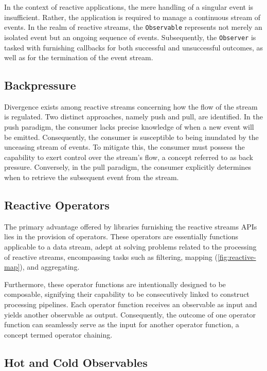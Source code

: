 \documentclass[12pt,a4paper,openright,twoside]{book}
\begin{document}
In the context of reactive applications, the mere handling of a singular event is insufficient. Rather, the application is required to manage a continuous stream of events. In the realm of reactive streams, the \texttt{Observable} represents not merely an isolated event but an ongoing sequence of events. Subsequently, the \texttt{Observer} is tasked with furnishing callbacks for both successful and unsuccessful outcomes, as well as for the termination of the event stream.

\subsection{Backpressure}

Divergence exists among reactive streams concerning how the flow of the stream is regulated. Two distinct approaches, namely push and pull, are identified. In the push paradigm, the consumer lacks precise knowledge of when a new event will be emitted. Consequently, the consumer is susceptible to being inundated by the unceasing stream of events. To mitigate this, the consumer must possess the capability to exert control over the stream's flow, a concept referred to as back pressure. Conversely, in the pull paradigm, the consumer explicitly determines when to retrieve the subsequent event from the stream.

\subsection{Reactive Operators}

The primary advantage offered by libraries furnishing the reactive streams APIs lies in the provision of operators. These operators are essentially functions applicable to a data stream, adept at solving problems related to the processing of reactive streams, encompassing tasks such as filtering, mapping (\cref{fig:reactive-map}), and aggregating.

Furthermore, these operator functions are intentionally designed to be composable, signifying their capability to be consecutively linked to construct processing pipelines. Each operator function receives an observable as input and yields another observable as output. Consequently, the outcome of one operator function can seamlessly serve as the input for another operator function, a concept termed operator chaining.

\subsection{Hot and Cold Observables}
\end{document}
